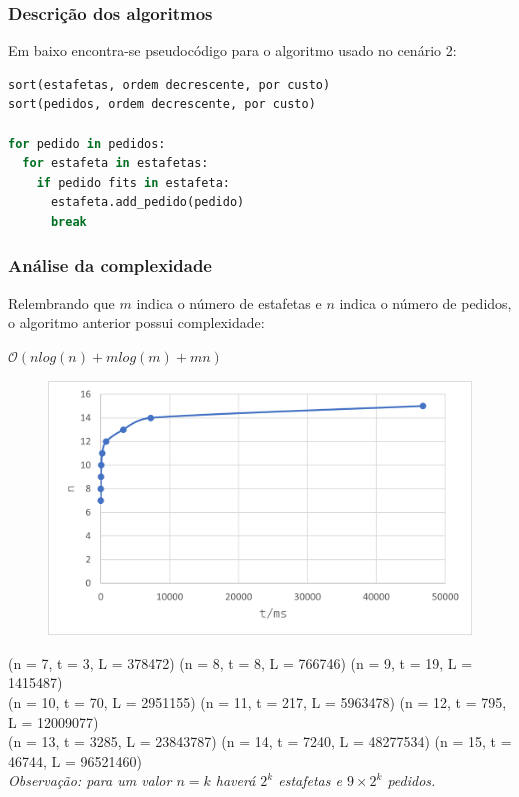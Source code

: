 \documentclass{beamer}
\begin{document}
\begin{frame}[fragile]
\frametitle{Descrição dos algoritmos}
Em baixo encontra-se pseudocódigo para o algoritmo usado no cenário 2:\\
\begin{lstlisting}[language=python]
sort(estafetas, ordem decrescente, por custo)
sort(pedidos, ordem decrescente, por custo)

for pedido in pedidos:
  for estafeta in estafetas:
    if pedido fits in estafeta:
      estafeta.add_pedido(pedido)
      break
\end{lstlisting}
\end{frame}

\begin{frame}
\frametitle{Análise da complexidade}
Relembrando que $m$ indica o número de estafetas e $n$ indica o número de pedidos, o algoritmo anterior
possui complexidade:\\ 
\centerline{$\mathcal{O}(nlog(n) + mlog(m) + mn)$}

\begin{figure}
\includegraphics[width=0.5\linewidth]{assets/scenario2.png}
\end{figure}
{\tiny (n = 7, t = 3, L = 378472) \hspace{0.1cm} (n = 8, t = 8, L = 766746) \hspace{0.1cm} (n = 9, t = 19, L = 1415487)}\\
{\tiny (n = 10, t = 70, L = 2951155) \hspace{0.1cm} (n = 11, t = 217, L = 5963478) \hspace{0.1cm} (n = 12, t = 795, L = 12009077)}\\
{\tiny (n = 13, t = 3285, L = 23843787) \hspace{0.1cm} (n = 14, t = 7240, L = 48277534) \hspace{0.1cm} (n = 15, t = 46744, L = 96521460)}\\

{\footnotesize \textit{Observação: para um valor $n = k$ haverá $2^{k}$ estafetas e $ 9 \times 2^{k}$ pedidos.}}
\end{frame}
\end{document}
